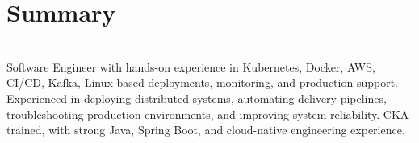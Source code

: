 \MainDivider
\section*{Summary}
\BigDivider\\
\noindent
Software Engineer with hands-on experience in Kubernetes, Docker, AWS, CI/CD, Kafka, Linux-based deployments, monitoring, and production support. Experienced in deploying distributed systems, automating delivery pipelines, troubleshooting production environments, and improving system reliability. CKA-trained, with strong Java, Spring Boot, and cloud-native engineering experience.
